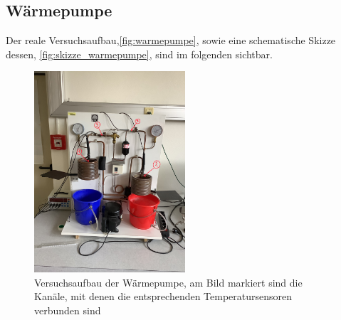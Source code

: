 \documentclass[12pt,english,ngerman]{scrartcl}
\begin{document}
\subsection{Wärmepumpe}

Der reale Versuchsaufbau,\autoref{fig:warmepumpe}, sowie eine schematische
Skizze dessen, \autoref{fig:skizze_warmepumpe}, sind im folgenden sichtbar.

\begin{figure}[H]
	\begin{center}
		\includegraphics[width =0.5\textwidth]{./figures/warmepumpe_anschlusse.png}
	\end{center}
	\caption[Versuchsaufbau der Wärmepumpe]{Versuchsaufbau der Wärmepumpe, am Bild markiert
		sind die Kanäle, mit denen die entsprechenden Temperatursensoren verbunden sind
	}\label{fig:warmepumpe}
\end{figure}
\end{document}
